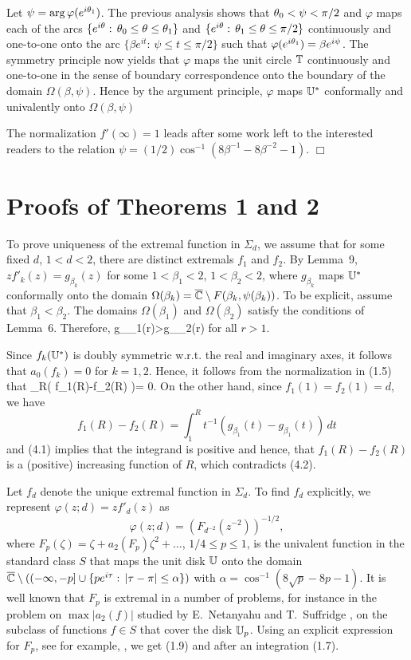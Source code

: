 \medskip

Let $\psi=\arg \varphi(e^{i\theta_1})$. The previous analysis shows that $\theta_0<\psi<\pi/2$ and $\varphi$ maps each 
of the arcs $\{e^{i\theta}:\,\theta_0\le \theta\le \theta_1\}$ and $\{e^{i\theta}:\,\theta_1\le \theta\le\pi/2\}$ continuously and one-to-one onto
the arc $\{\beta e^{it}:\,\psi\le t\le \pi/2\}$ such that $\varphi(e^{i\theta_1})=\beta e^{i\psi}$. The symmetry principle now
yields that $\varphi$ maps the unit circle ${\Bbb{T}}$ continuously and one-to-one in the sense of boundary correspondence
onto the boundary of the domain $\Omega(\beta,\psi)$. Hence by the argument principle, $\varphi$ maps ${\Bbb{U}}^*$ conformally
and univalently onto $\Omega(\beta,\psi)$

The normalization $f'(\infty)=1$ leads after some work left to the interested readers to the relation $\psi=(1/2)\cos^{-1}(8\beta^{-1}-8\beta^{-2}-1)$.
$\Box$

\section{Proofs of Theorems 1 and 2}
\setcounter{equation}{0}


To prove uniqueness of the extremal function in $\Sigma_d$, we assume that for some fixed $d$,  $1<d<2$, there are 
distinct extremals $f_1$ and $f_2$. By Lemma~9, $zf'_k(z)=g_{\beta_k}(z)$ for some $1<\beta_1<2$, $1<\beta_2<2$, where $g_{\beta_k}$ maps ${\Bbb{U}}^*$ conformally onto the domain
$\Omega(\beta_k)=\overline{{\Bbb {C}}}\setminus F(\beta_k,\psi(\beta_k))$.  To be explicit, assume that $\beta_1<\beta_2$. 
The domains $\Omega(\beta_1)$ and $\Omega(\beta_2)$ satisfy the conditions of Lemma~6. Therefore, 
\be
g_{\beta_1}(r)>g_{\beta_2}(r)
\ee
for all $r>1$.

Since $f_k({\Bbb{U}}^*)$ is doubly symmetric w.r.t. the real and imaginary axes, it follows that $a_0(f_k) = 0$ for $k=1,2$.  Hence, it follows from the normalization in (1.5) that 
\be
\lim_{R\to \infty}\left ( f_1(R)-f_2(R) \right )= 0.
\ee
On the other hand, since $f_1(1)=f_2(1)=d$, we have
$$
f_1(R)-f_2(R)=\int_1^R t^{-1}(g_{\beta_1}(t)-g_{\beta_1}(t))\,dt
$$
and (4.1) implies that the integrand is positive and hence, that $f_1(R)-f_2(R)$ is a (positive) increasing function of $R$, which 
contradicts  (4.2).

Let $f_d$ denote the  unique extremal function in $\Sigma_d$.
To find $f_d$ explicitly, we represent $\varphi(z;d)=zf'_d(z)$ as
$$
\varphi(z;d)=(F_{d^{-2}}(z^{-2}))^{-1/2},
$$
where $F_p(\zeta) = \zeta+a_2(F_p)\zeta^2+\ldots$, $1/4\le p\le 1$, is the univalent function in the standard class $S$ that maps the unit disk
${\Bbb{U}}$ onto the domain $\overline{{\Bbb {C}}}\setminus ((-\infty,-p]\cup \{pe^{i\tau}:\,|\tau-\pi|\le \alpha\})$ with  $\alpha=\cos^{-1}(8\sqrt{p}-8p-1)$. It
is well known that $F_p$ is extremal in a number of problems, for instance in the problem on $\max |a_2(f)|$ 
studied by E.~Netanyahu \cite{N} and T.~Suffridge \cite{S}, 
on the subclass of functions $f\in S$ that cover the disk ${\Bbb{U}}_p$. Using an explicit expression for $F_p$, see for example,
\cite{S}, we get (1.9) and after an  integration (1.7).

